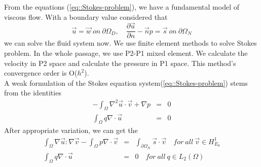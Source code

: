 \documentclass[a4paper]{article}
\begin{document}
From the equations (\ref{eq::Stokes-problem}), we have a fundamental model of viscous flow. With a boundary value considered that
\begin{equation}
\vec{u} = \vec{w} \ on \ \partial \Omega_D ,\quad \frac{\partial \vec{u}}{\partial n} - \vec{n} p = \vec{s} \ on \ \partial \Omega_N
\end{equation}
we can solve the fluid system now. We use finite element methods to solve Stokes problem. In the whole passage, we use P2-P1 mixed element. We calculate the velocity in P2 space and calculate the pressure in P1 space. This method's convergence order is O($h^2$).\\
\indent A weak formulation of the Stokes equation system(\ref{eq::Stokes-problem}) stems from the identities
\begin{equation}
\begin{array}{rcl}
-\int_\Omega \nabla^2 \vec{u} \cdot \vec{v} + \nabla p &=& 0\\
\int_\Omega q\nabla \cdot \vec{u} &=&0
\label{eq::Stokes-weakform}
\end{array}
\end{equation}
\indent After appropriate variation, we can get the
\begin{equation}
\begin{array}{rcl}
\int_\Omega \nabla \vec{u} : \nabla \vec{v} - \int_\Omega p\nabla \cdot \vec{v} &=& \int_{\partial \Omega_N}\vec{s}\cdot \vec{v} \quad for \ all \ \vec{v} \in H^1_{E_0}\\
\int_\Omega q\nabla \cdot \vec{u} &=& 0 \quad for \ all \ q\in L_2(\Omega)
\label{eq::Stokes}
\end{array}
\end{equation}
\end{document}
